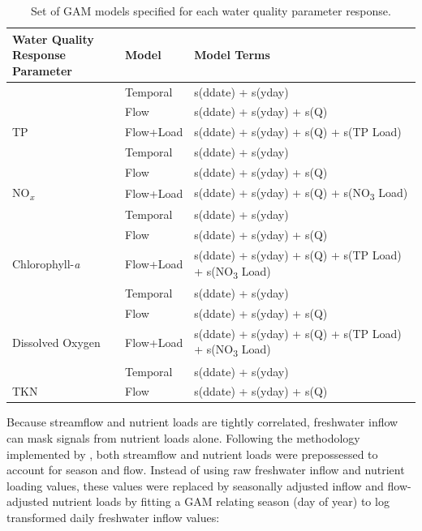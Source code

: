 \documentclass[water,article,submit,oneauthor]{Definitions/mdpi}
\begin{document}
\begin{table}[H]

\caption{\label{tab:estgammodels}Set of GAM models specified for each water quality parameter response.}
\centering
\begin{tabular}[t]{lll}
\toprule
\makecell[l]{Water Quality\\Response Parameter} & Model & Model Terms\\
\midrule
 & Temporal & s(ddate) + s(yday)\\

 & Flow & s(ddate) + s(yday) + s(Q)\\

\multirow{-3}{*}{\raggedright\arraybackslash TP} & Flow+Load & s(ddate) + s(yday) + s(Q) + s(TP Load)\\
\cmidrule{1-3}
 & Temporal & s(ddate) + s(yday)\\

 & Flow & s(ddate) + s(yday) + s(Q)\\

\multirow{-3}{*}{\raggedright\arraybackslash NO\textsubscript{\emph{x}}} & Flow+Load & s(ddate) + s(yday) + s(Q) + s(NO\textsubscript{3} Load)\\
\cmidrule{1-3}
 & Temporal & s(ddate) + s(yday)\\

 & Flow & s(ddate) + s(yday) + s(Q)\\

\multirow{-3}{*}{\raggedright\arraybackslash Chlorophyll-\emph{a}} & Flow+Load & s(ddate) + s(yday) + s(Q) + s(TP Load) + s(NO\textsubscript{3} Load)\\
\cmidrule{1-3}
 & Temporal & s(ddate) + s(yday)\\

 & Flow & s(ddate) + s(yday) + s(Q)\\

\multirow{-3}{*}{\raggedright\arraybackslash Dissolved Oxygen} & Flow+Load & s(ddate) + s(yday) + s(Q) + s(TP Load) + s(NO\textsubscript{3}  Load)\\
\cmidrule{1-3}
 & Temporal & s(ddate) + s(yday)\\

\multirow{-2}{*}{\raggedright\arraybackslash TKN} & Flow & s(ddate) + s(yday) + s(Q)\\
\bottomrule
\end{tabular}
\end{table}

Because streamflow and nutrient loads are tightly correlated, freshwater
inflow can mask signals from nutrient loads alone. Following the
methodology implemented by
\citet{murphyNutrientImprovementsChesapeake2022}, both streamflow and
nutrient loads were prepossessed to account for season and flow. Instead
of using raw freshwater inflow and nutrient loading values, these values
were replaced by seasonally adjusted inflow and flow-adjusted nutrient
loads by fitting a GAM relating season (day of year) to log transformed
daily freshwater inflow values:
\end{document}
